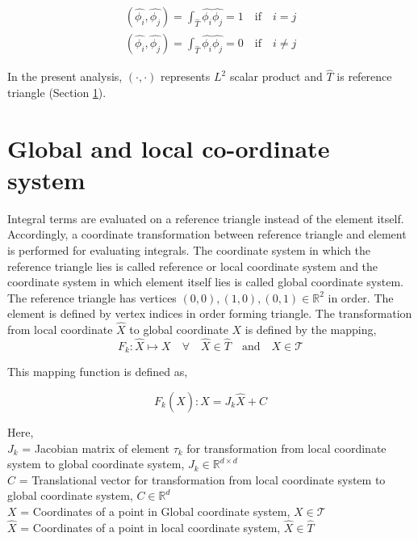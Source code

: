 \documentclass[a4paper]{book}
\begin{document}
\begin{equation}
\begin{split}
(\hat{\phi_i } , \hat{\phi_j}) = \int_{\hat{T}} \hat{\phi_i} \hat{\phi_j} = 1 \quad \textrm{if} \quad i = j \\
(\hat{\phi_i } , \hat{\phi_j}) = \int_{\hat{T}} \hat{\phi_i} \hat{\phi_j} = 0 \quad \textrm{if} \quad i \neq j 
\end{split}
\end{equation}

In the present analysis, $(\cdot,\cdot)$ represents $L^2$ scalar product and $\hat{T}$ is reference triangle (Section \ref{section_glob_loc}). 

\section{Global and local co-ordinate system} \label{section_glob_loc}

Integral terms are evaluated on a reference triangle instead of the element itself. Accordingly, a coordinate transformation between reference triangle and element is performed for evaluating integrals. The coordinate system in which the reference triangle lies is called reference or local coordinate system and the coordinate system in which element itself lies is called global coordinate system. The reference triangle has vertices $(0,0),(1,0),(0,1) \in \mathbb{R}^2$ in order. The element is defined by vertex indices in order forming triangle. The transformation from local coordinate $\hat{X}$ to global coordinate $X$ is defined by the mapping,
\begin{equation}\label{local global mapping}
F_k:\hat{X} \mapsto X \quad \forall \quad \hat{X} \in \hat{T} \quad \textrm{and} \quad X \in \mathcal{T}
\end{equation}

This mapping function is defined as,

\begin{equation}\label{local global mapping equation}
F_k(\hat{X}): X = J_k \hat{X} + C
\end{equation}

Here,
\\
$J_k$ = Jacobian matrix of element $\tau_k$ for transformation from local coordinate system to global coordinate system, $J_k \in \mathbb{R}^{d \times d}$\\
$C$ = Translational vector for transformation from local coordinate system to global coordinate system, $C \in \mathbb{R}^d$\\
$X$ = Coordinates of a point in Global coordinate system, $X \in \mathcal{T}$ \\
$\hat{X}$ = Coordinates of a point in local coordinate system, $\hat{X} \in \hat{T}$\\
\end{document}
